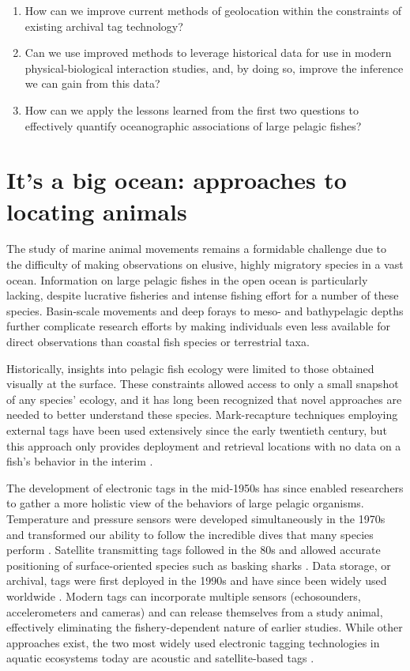 \begin{enumerate}
    \item How can we improve current methods of geolocation within the constraints of existing archival tag technology?
    \item Can we use improved methods to leverage historical data for use in modern physical-biological interaction studies, and, by doing so, improve the inference we can gain from this data?
    \item How can we apply the lessons learned from the first two questions to effectively quantify oceanographic associations of large pelagic fishes?
\end{enumerate}

\section{It's a big ocean: approaches to locating animals}
The study of marine animal movements remains a formidable challenge due to the difficulty of making observations on elusive, highly migratory species in a vast ocean. Information on large pelagic fishes in the open ocean is particularly lacking, despite lucrative fisheries and intense fishing effort for a number of these species. Basin-scale movements \citep{Skomal2009} and deep forays to meso- and bathypelagic depths \citep{Thorrold2014} further complicate research efforts by making individuals even less available for direct observations than coastal fish species or terrestrial taxa.

Historically, insights into pelagic fish ecology were limited to those obtained visually at the surface. These constraints allowed access to only a small snapshot of any species' ecology, and it has long been recognized that novel approaches are needed to better understand these species. Mark-recapture techniques employing external tags have been used extensively since the early twentieth century, but this approach only provides deployment and retrieval locations with no data on a fish's behavior in the interim \citep{Kohler2001}.

The development of electronic tags in the mid-1950s has since enabled researchers to gather a more holistic view of the behaviors of large pelagic organisms. Temperature and pressure sensors were developed simultaneously in the 1970s and transformed our ability to follow the incredible dives that many species perform \citep{Carey1981}. Satellite transmitting tags followed in the 80s and allowed accurate positioning of surface-oriented species such as basking sharks \citep{Priede1984}. Data storage, or archival, tags were first deployed in the 1990s and have since been widely used worldwide \citep{Hussey2015}. Modern tags can incorporate multiple sensors (\eg echosounders, accelerometers and cameras) and can release themselves from a study animal, effectively eliminating the fishery-dependent nature of earlier studies. While other approaches exist, the two most widely used electronic tagging technologies in aquatic ecosystems today are acoustic and satellite-based tags \citep{Hussey2015}.

